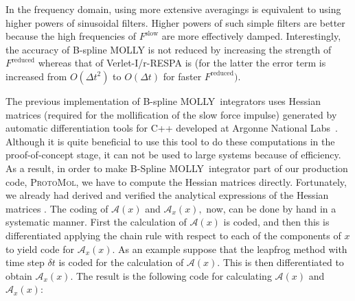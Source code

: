 \documentclass[11pt]{article}
\newcommand{\ProtoMol}{\textsc{ProtoMol}}
\newcommand{\MOLLY}{\textsc{MOLLY\ }}
\begin{document}

In the frequency domain, using more extensive averagings is equivalent to
using higher powers of sinusoidal filters. 
Higher powers of such simple filters are better because the high frequencies
of $F^{\mathrm{slow}}$ are more effectively damped.
Interestingly, the accuracy of B-spline MOLLY is not reduced by
increasing the strength of $F^{\mathrm{reduced}}$ whereas that of
Verlet-I/r-RESPA is (for the latter the error term is increased from
$O(\Delta t^{2})$ to $O(\Delta t)$ for faster $F^{\mathrm{reduced}}).$

The previous implementation of B-spline \MOLLY integrators 
uses Hessian matrices (required for the mollification of
the slow force impulse) generated by automatic differentiation tools for C++
developed at Argonne National Labs~\cite{ADOL-C}. 
Although it is quite beneficial to use
this tool to do these computations in the proof-of-concept stage, it can
not be used to large systems because of efficiency. As a result, in
order to make B-Spline \MOLLY integrator part of our production code,
\ProtoMol, we have to compute the Hessian matrices
directly. Fortunately, we already had derived and verified the
analytical expressions of the Hessian matrices \cite{MaIz01}.
The coding of $\mathcal{A}
(x)$ and $\mathcal{A}_{x}(x),$ now, can be done by hand in a systematic
manner. First the calculation of $\mathcal{A}(x)$ is coded, and then this is
differentiated applying the chain rule with respect to each of the components
of $x$ to yield code for $\mathcal{A}_{x}(x)$. As an example suppose that the
leapfrog method with time step $\delta t$ is coded for the calculation of
$\mathcal{A}(x)$. This is then differentiated to obtain $\mathcal{A}_{x}(x)$.
The result is the following code for calculating $\mathcal{A}(x)$ and
$\mathcal{A}_{x}(x)$:
\end{document}

